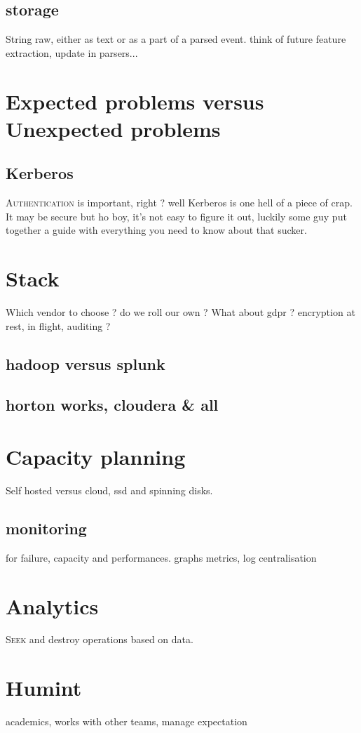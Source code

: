 \documentclass[a4paper,12pt]{article}
\begin{document}
\subsection{storage}
String raw, either as text or as a part of a parsed event. think of future feature extraction, update in parsers...
\newpage
\section{Expected problems versus Unexpected problems}
\subsection{Kerberos}
\lettrine{A}{uthentication} is important, right ? well Kerberos is one hell of a piece of crap.
It may be secure but ho boy, it's not easy to figure it out, luckily some guy put together a guide with everything you need to know about that sucker.
\newpage
\section{Stack}
Which vendor to choose ? do we roll our own ? 
What about gdpr ? encryption at rest, in flight, auditing ? 
\subsection{hadoop versus splunk}
\subsection{horton works, cloudera \& all}
\newpage
\section{Capacity planning}
Self hosted versus cloud, ssd and spinning disks.
\subsection{monitoring}
for failure, capacity and performances.
graphs metrics, log centralisation
\newpage
\section{Analytics}
\lettrine{S}{eek} and destroy operations based on data.
\section{Humint}
academics, works with other teams, manage expectation
\end{document}
